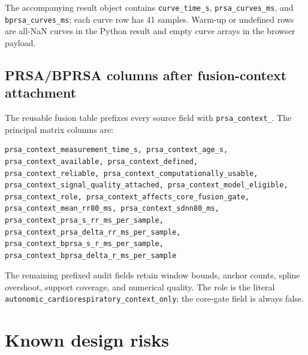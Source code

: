 \documentclass[11pt,a4paper]{article}
\begin{document}
The accompanying result object contains
\texttt{curve\_time\_s}, \texttt{prsa\_curves\_ms}, and
\texttt{bprsa\_curves\_ms}; each curve row has 41 samples. Warm-up or
undefined rows are all-NaN curves in the Python result and empty curve arrays
in the browser payload.

\subsection{PRSA/BPRSA columns after fusion-context attachment}

The reusable fusion table prefixes every source field with
\texttt{prsa\_context\_}. The principal matrix columns are:
\begin{lstlisting}
prsa_context_measurement_time_s, prsa_context_age_s,
prsa_context_available, prsa_context_defined,
prsa_context_reliable, prsa_context_computationally_usable,
prsa_context_signal_quality_attached, prsa_context_model_eligible,
prsa_context_role, prsa_context_affects_core_fusion_gate,
prsa_context_mean_rr80_ms, prsa_context_sdnn80_ms,
prsa_context_prsa_s_rr_ms_per_sample,
prsa_context_prsa_delta_rr_ms_per_sample,
prsa_context_bprsa_s_r_ms_per_sample,
prsa_context_bprsa_delta_r_ms_per_sample
\end{lstlisting}
The remaining prefixed audit fields retain window bounds, anchor counts,
spline overshoot, support coverage, and numerical quality. The role is the
literal \texttt{autonomic\_cardiorespiratory\_context\_only}; the core-gate
field is always false.

\section{Known design risks}
\end{document}
